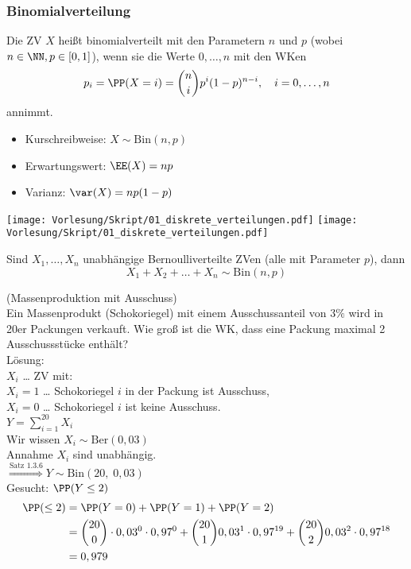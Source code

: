 \documentclass{scrreprt}
\begin{document}
\subsubsection{Binomialverteilung}
 Die ZV $X$ heißt binomialverteilt mit den Parametern $n$ und $p$ (wobei $n \in \NN, p\in [0,1]$), wenn sie die Werte $0,\dots, n$ mit den WKen
$$p_i=\PP(X=i)=\binom{n}{i}p^i (1-p)^{n-i}, \quad i=0,\dots ,n$$
annimmt.
\begin{itemize}
\item Kurschreibweise: $X \sim \mathrm{Bin}(n,p)$
\item Erwartungswert: $\EE(X)=np$
\item Varianz: $\var (X) = np (1-p)$
\end{itemize}
\begin{center}
\texttt{[image: Vorlesung/Skript/01\_diskrete\_verteilungen.pdf]}
\texttt{[image: Vorlesung/Skript/01\_diskrete\_verteilungen.pdf]}
\end{center}
 Sind $X_1, \dots , X_n$ unabhängige Bernoulliverteilte ZVen (alle mit Parameter $p$), dann 
$$X_1+X_2+\dots + X_n \sim \mathrm{Bin}(n,p)$$

 (Massenproduktion mit Ausschuss)\\
Ein Massenprodukt (Schokoriegel) mit einem Ausschussanteil von $3\%$ wird in 20er Packungen verkauft. Wie groß ist die WK, dass eine Packung maximal 2 Ausschussstücke enthält?\\
Lösung:\\
$X_i$ … ZV mit:\\
$X_i=1 $ … Schokoriegel $i$ in der Packung ist Ausschuss,\\
$X_i = 0 $ … Schokoriegel $i$ ist keine Ausschuss.\\
$Y=\sum_{i=1}^{20}X_i$\\
Wir wissen $X_i \sim \mathrm{Ber}(0,03)$\\
Annahme $X_i$ sind unabhängig.\\
$\overset{\text{Satz 1.3.6}}{\Longrightarrow} Y \sim \mathrm{Bin}(20,\; 0,03)$\\
Gesucht: $\PP(Y \leq 2)$
\begin{align*}
\PP(\leq 2)&= \PP(Y=0)+\PP(Y=1) + \PP(Y=2)\\
&= \binom{20}{0}\cdot 0,03^0 \cdot 0,97^0 + \binom{20}{1} 0,03^1 \cdot 0,97^{19} + \binom{20}{2} 0,03^2 \cdot 0,97^{18}\\
&= 0,979
\end{align*}
\end{document}
